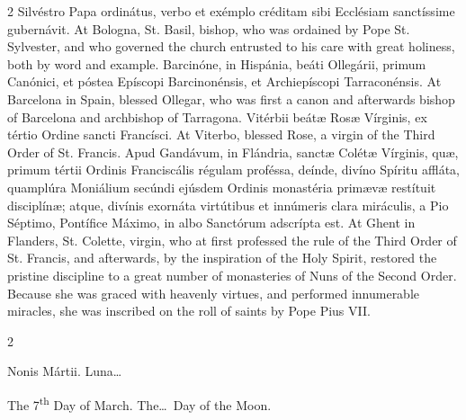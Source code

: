 \begin{paracol}{2}
 Silvéstro Papa ordinátus, verbo et exémplo créditam sibi Ecclésiam 
 sanctíssime gubernávit.
\switchcolumn
{}
At Bologna, St. Basil, bishop, who was ordained by Pope St. Sylvester, and 
 who governed the church entrusted to his care with great holiness, both by 
 word and example.
\switchcolumn*
{}
Barcinóne, in Hispánia, beáti Ollegárii, primum Canónici, et póstea Epíscopi 
 Barcinonénsis, et Archiepíscopi Tarraconénsis.
\switchcolumn
{}
At Barcelona in Spain, blessed Ollegar, who was first a canon and afterwards 
 bishop of Barcelona and archbishop of Tarragona.
\switchcolumn*
{}
Vitérbii beátæ Rosæ Vírginis, ex tértio Ordine 
 sancti Francísci.
\switchcolumn
{}
At Viterbo, blessed Rose, a virgin of the Third Order of St. Francis.
\switchcolumn*
{}
Apud Gandávum, in Flándria, sanctæ Colétæ 
 Vírginis, quæ, primum tértii Ordinis Franciscális régulam proféssa, deínde, 
 divíno Spíritu affláta, quamplúra Moniálium secúndi ejúsdem Ordinis 
 monastéria primævæ restítuit disciplínæ; atque, divínis exornáta virtútibus 
 et innúmeris clara miráculis, a Pio Séptimo, Pontífice Máximo, in albo 
 Sanctórum adscrípta est.
\switchcolumn
{}
At Ghent in Flanders, St. Colette, virgin, who at first professed the rule 
 of the Third Order of St. Francis, and afterwards, by the inspiration of the 
 Holy Spirit, restored the pristine discipline to a great number of 
 monasteries of Nuns of the Second Order. Because she was graced 
 with heavenly virtues, and performed innumerable miracles, she was inscribed 
 on the roll of saints by Pope Pius VII.
\switchcolumn*
{}
\end{paracol}


\begin{paracol}{2}
\begin{center}{\color{gregoriocolor} Nonis Mártii. 
 Luna\dots\ }\end{center}
\switchcolumn
{}
\begin{center}{\color{gregoriocolor} The 7\textsuperscript{th} Day of March. 
 The\dots\ Day of the Moon.}\end{center}
\end{paracol}

